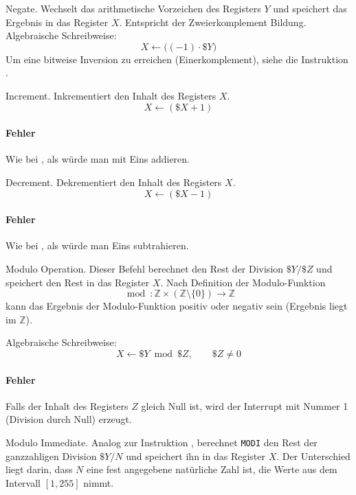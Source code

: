 \glqq Negate\grqq.
Wechselt das arithmetische Vorzeichen des Registers $Y$ und speichert das
Ergebnis in das Register $X$. Entspricht der Zweierkomplement Bildung.
Algebraische Schreibweise:
\[
    X \gets \big( (-1) \cdot \$Y \big)
\]
Um eine bitweise Inversion zu erreichen (Einerkomplement), siehe die
Instruktion .



\glqq Increment\grqq.
Inkrementiert den Inhalt des Registers $X$.
\[
    X \gets ( \$X + 1 )
\]

\paragraph{Fehler} Wie bei , als würde man mit Eins addieren.



\glqq Decrement\grqq.
Dekrementiert den Inhalt des Registers $X$.
\[
    X \gets ( \$X - 1 )
\]

\paragraph{Fehler} Wie bei , als würde man Eins subtrahieren.



Modulo Operation.
Dieser Befehl berechnet den Rest der Division $\$Y/\$Z$ und speichert den Rest
in das Register
$X$. Nach Definition der Modulo-Funktion
\[
  \bmod : \mathds{Z} \times (\mathds{Z}\setminus \{0\})
  \to \mathds{Z}
\]
kann das Ergebnis der Modulo-Funktion positiv oder negativ sein (Ergebnis
liegt im $\mathds{Z}$).


Algebraische Schreibweise:
\[
    X \gets \$Y \bmod \$Z, \qquad \$Z \neq 0
\]

\paragraph{Fehler}
Falls der Inhalt des Registers $Z$ gleich Null ist, wird der Interrupt mit
Nummer 1 (Division durch Null) erzeugt.


\glqq Modulo Immediate\grqq. Analog zur Instruktion , berechnet
\texttt{MODI} den Rest der ganzzahligen Division $\$Y/N$ und speichert ihn in
das Register $X$. Der Unterschied liegt darin, dass $N$ eine fest angegebene
natürliche Zahl ist, die Werte aus dem Intervall $[1, 255]$ nimmt.

